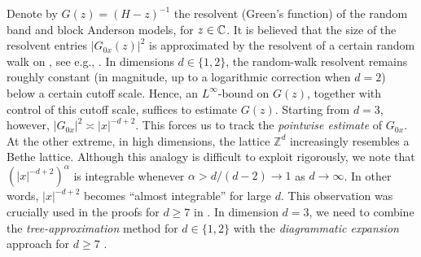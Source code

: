  
Denote by $G(z)=(H-z)^{-1}$ the resolvent (Green's function) of the random band and block Anderson models, for $z\in \mathbb C$. 
It is believed that the size of the resolvent entries $|G_{0x}(z)|^2$ is approximated by the resolvent of a certain random walk on , see e.g., \cite{erdos2013delocalization,yang2021delocalization}. 
In dimensions $d\in\{1,2\}$, the random-walk resolvent remains roughly constant (in magnitude, up to a logarithmic correction when $d=2$) below a certain cutoff scale. Hence, an $L^\infty$-bound on $G(z)$, together with control of this cutoff scale, suffices to estimate $G(z)$. 
Starting from $d=3$, however, $|G_{0x}|^2  \asymp |x|^{-d+2}$. This forces us to track the  \emph{pointwise estimate} of $G_{0x}$. 
At the other extreme, in high dimensions, the lattice $\mathbb Z^d$ increasingly resembles a Bethe lattice. Although this analogy is difficult to exploit rigorously, we note that $(|x|^{-d+2})^\alpha$ is integrable whenever $\alpha > d/(d-2) \to 1$ as $d\to \infty$. In other words, $|x|^{-d+2}$ becomes ``almost integrable'' for large $d$. This observation was crucially used in the proofs for $d\ge 7$ in \cite{yang2021delocalization, yang2022delocalization, Xu:2024aa}.  
In dimension $d=3$, we need to combine the \emph{tree-approximation} method for $d\in\{1,2\}$ \cite{YY_25, DYYY25} with the \emph{diagrammatic expansion} approach for $d\ge 7$ \cite{yang2021delocalization, yang2022delocalization, Xu:2024aa}. 




